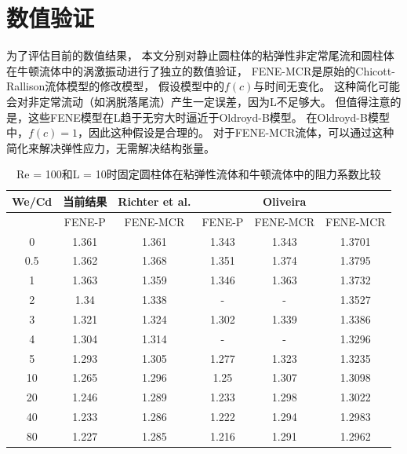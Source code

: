 \documentclass[UTF8,zihao=5]{ctexart} %
\begin{document}
\section{数值验证}

为了评估目前的数值结果，
本文分别对静止圆柱体的粘弹性非定常尾流和圆柱体在牛顿流体中的涡激振动进行了独立的数值验证，
FENE-MCR是原始的Chicott-Rallison流体模型的修改模型，
假设模型中的$f(c)$与时间无变化。
这种简化可能会对非定常流动（如涡脱落尾流）产生一定误差，因为L不足够大。
但值得注意的是，这些FENE模型在L趋于无穷大时逼近于Oldroyd-B模型。
在Oldroyd-B模型中，$f(c)=1$，因此这种假设是合理的。
对于FENE-MCR流体，可以通过这种简化来解决弹性应力，无需解决结构张量。




\begin{table}[htbp]
    \begin{center}
        \caption{Re = 100和L = 10时固定圆柱体在粘弹性流体和牛顿流体中的阻力系数比较}
        \label{tab:2}
        \begin{tabular}{cccccc}
            \hline
            We/Cd & 当前结果 & Richter et al. &        & Oliveira            \\
            \hline
                  & FENE-P   & FENE-MCR       & FENE-P & FENE-MCR & FENE-MCR \\
            0     & 1.361    & 1.361          & 1.343  & 1.343    & 1.3701   \\
            0.5   & 1.362    & 1.368          & 1.351  & 1.374    & 1.3795   \\
            1     & 1.363    & 1.359          & 1.346  & 1.363    & 1.3732   \\
            2     & 1.34     & 1.338          & -      & -        & 1.3527   \\
            3     & 1.321    & 1.324          & 1.302  & 1.339    & 1.3386   \\
            4     & 1.304    & 1.314          & -      & -        & 1.3296   \\
            5     & 1.293    & 1.305          & 1.277  & 1.323    & 1.3235   \\
            10    & 1.265    & 1.296          & 1.25   & 1.307    & 1.3098   \\
            20    & 1.246    & 1.289          & 1.233  & 1.298    & 1.3022   \\
            40    & 1.233    & 1.286          & 1.222  & 1.294    & 1.2983   \\
            80    & 1.227    & 1.285          & 1.216  & 1.291    & 1.2962   \\
            \hline
        \end{tabular}
    \end{center}
\end{table}
\end{document}
